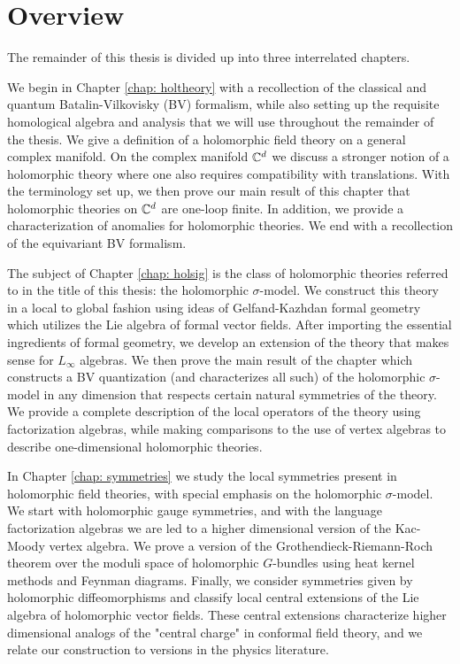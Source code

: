 \section{Overview}

The remainder of this thesis is divided up into three interrelated chapters. 

We begin in Chapter \ref{chap: holtheory} with a recollection of the classical and quantum Batalin-Vilkovisky (BV) formalism, while also setting up the requisite homological algebra and analysis that we will use throughout the remainder of the thesis. 
We give a definition of a holomorphic field theory on a general complex manifold. 
On the complex manifold $\mathbb C^d$ we discuss a stronger notion of a holomorphic theory where one also requires compatibility with translations. 
With the terminology set up, we then prove our main result of this chapter that holomorphic theories on $\mathbb C^d$ 
are one-loop finite.
In addition, we provide a characterization of anomalies for holomorphic theories. 
We end with a recollection of the equivariant BV formalism. 

The subject of Chapter \ref{chap: holsig} is the class of holomorphic theories referred to in the title of this thesis: the holomorphic $\sigma$-model.
We construct this theory in a local to global fashion using ideas of Gelfand-Kazhdan formal geometry which utilizes the Lie algebra of formal vector fields. 
After importing the essential ingredients of formal geometry, we develop an extension of the theory that makes sense for $L_\infty$ algebras.
We then prove the main result of the chapter which constructs a BV quantization (and characterizes all such) of the holomorphic $\sigma$-model in any dimension that respects certain natural symmetries of the theory.
We provide a complete description of the local operators of the theory using factorization algebras, while making comparisons to the use of vertex algebras to describe one-dimensional holomorphic theories. 

In Chapter \ref{chap: symmetries} we study the local symmetries present in holomorphic field theories, with special emphasis on the holomorphic $\sigma$-model.
We start with holomorphic gauge symmetries, and with the language factorization algebras we are led to a higher dimensional version of the Kac-Moody vertex algebra.
We prove a version of the Grothendieck-Riemann-Roch theorem over the moduli space of holomorphic $G$-bundles using heat kernel methods and Feynman diagrams. 
Finally, we consider symmetries given by holomorphic diffeomorphisms and classify local central extensions of the Lie algebra of holomorphic vector fields. 
These central extensions characterize higher dimensional analogs of the "central charge" in conformal field theory, and we relate our construction to versions in the physics literature. 
